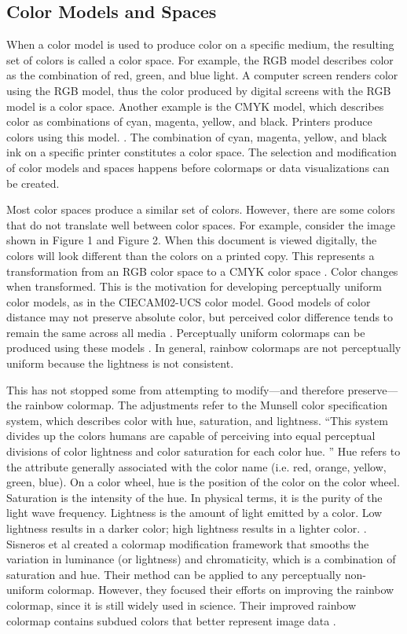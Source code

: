 \documentclass[journal,12pt]{IEEEtran}
\begin{document}
\subsection{Color Models and Spaces}

When a color model is used to produce color on a specific medium, the resulting set
of colors is called a color space. For example, the RGB model
describes color as the combination of red, green, and
blue light. A computer screen renders color using the
RGB model, thus the color produced by digital screens
with the RGB model is a color space. Another example is the
CMYK model, which describes color as combinations of
cyan, magenta, yellow, and black. Printers produce colors using this model.
\cite{colormapping}. The combination of cyan, magenta, yellow, and black
ink on a specific printer constitutes a color space. The selection and modification of color
models and spaces happens before colormaps or data visualizations can be created. 

Most color spaces produce a similar set of colors. However, there are some colors
that do not translate well between color spaces. For example, consider the image
shown in Figure 1 and Figure 2. When this document is viewed digitally, the colors will look
different than the colors on a printed copy. This represents
a transformation from an RGB color space to a CMYK color space \cite{colorvblackwhite}.
Color changes when transformed. This is the motivation for developing perceptually
uniform color models, as in the CIECAM02-UCS color model. Good models of color
distance may not preserve absolute color, but perceived color difference tends
to remain the same across all media \cite{ciecam02}. Perceptually uniform colormaps
can be produced using these models \cite{viridis}. In general, rainbow colormaps
are not perceptually uniform because the lightness is not consistent.

This has not stopped some from attempting to modify---and therefore preserve---the
rainbow colormap. The adjustments refer to the Munsell color specification system,
which describes color with hue, saturation, and lightness. ``This system
divides up the colors humans are capable of perceiving
into equal perceptual divisions of color lightness and
color saturation for each color hue. \cite{colormapping}''
Hue refers to the attribute generally associated with the color name (i.e. red,
orange, yellow, green, blue). On a color wheel, hue is the position of the color
on the color wheel. Saturation is the intensity of the hue. In
physical terms, it is the purity of the light wave frequency. Lightness is the
amount of light emitted by a color. Low lightness results in a darker color;
high lightness results in a lighter color. \cite{colorguidelines}.
Sisneros et al created a colormap modification framework that smooths the variation
in luminance (or lightness) and chromaticity, which is a combination of saturation
and hue. Their method can be applied to any perceptually non-uniform colormap.
However, they focused their efforts on improving the rainbow colormap, since it is still widely
used in science. Their improved rainbow colormap contains subdued colors that better
represent image data \cite{chasingrainbows}. 
\end{document}
